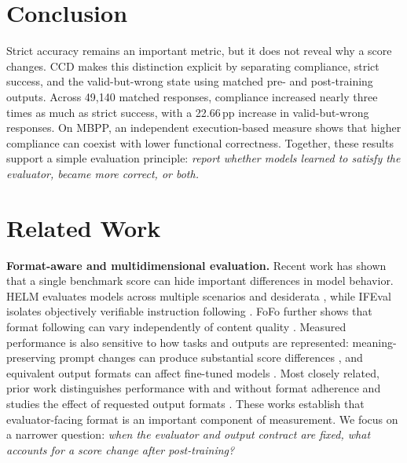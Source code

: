 \documentclass{article}
\newcommand{\pp}{\,pp}
\begin{document}
\vspace{-3mm}
\section{Conclusion}
\label{sec:conclusion}
\vspace{-2mm}
Strict accuracy remains an important metric, but it does not reveal why a score
changes. CCD makes this distinction explicit by separating compliance, strict
success, and the valid-but-wrong state using matched pre- and post-training
outputs. Across 49{,}140 matched responses, compliance increased nearly three
times as much as strict success, with a 22.66\pp{} increase in valid-but-wrong
responses. On MBPP, an independent execution-based measure shows that higher
compliance can coexist with lower functional correctness. Together, these
results support a simple evaluation principle: \emph{report whether models
learned to satisfy the evaluator, became more correct, or both.}




\clearpage
\newpage
\appendix

\section{Related Work}
\label{sec:related_work}

\noindent\textbf{Format-aware and multidimensional evaluation.}
Recent work has shown that a single benchmark score can hide important
differences in model behavior. HELM evaluates models across multiple scenarios
and desiderata \citep{liang2023holistic}, while IFEval isolates objectively
verifiable instruction following \citep{zhou2023ifeval}. FoFo further shows
that format following can vary independently of content quality
\citep{xia-etal-2024-fofo}. Measured performance is also sensitive to how tasks
and outputs are represented: meaning-preserving prompt changes can produce
substantial score differences \citep{sclar2024quantifying}, and equivalent
output formats can affect fine-tuned models
\citep{ravikumar-etal-2026-lost}. Most closely related, prior work
distinguishes performance with and without format adherence and studies the
effect of requested output formats \citep{long-etal-2025-llms}. These works
establish that evaluator-facing format is an important component of
measurement. We focus on a narrower question: \emph{when the evaluator and
output contract are fixed, what accounts for a score change after
post-training?}
\end{document}
